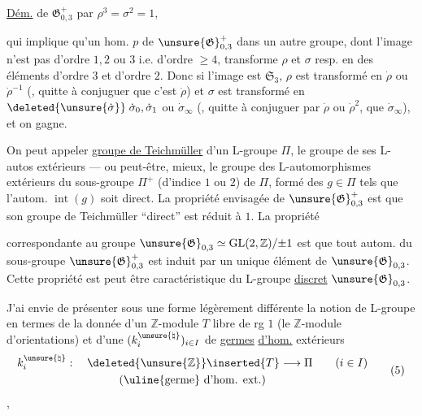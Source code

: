 \uline{Dém.} 
de $\mathfrak{G}_{0,3}^{+}$ par $\rho^3=\sigma^2=1$,

qui implique qu'un hom. $p$ de $\unsure{\mathfrak G}_{0,3}^{+}$ dans un autre groupe, dont l'image n'est pas d'ordre $1,2$ ou $3$ i.e. d'ordre $\geq 4$, transforme $\rho$ et $\sigma$ resp. en des éléments d'ordre $3$ et d'ordre $2$. Donc si l'image est $\mathfrak S_3$, $\rho$ est transformé en $\dot\rho$ ou $\dot\rho^{-1}$ (, quitte à conjuguer  que c'est $\dot\rho$) et $\sigma$ est transformé en $\deleted{\unsure{\dot\sigma}}\;\dot\sigma_0,\dot\sigma_1$ ou $\dot\sigma_\infty$ (, quitte à conjuguer par $\dot\rho$ ou $\dot\rho^2$, que  $\dot\sigma_\infty$), et on gagne.

On peut appeler \uline{groupe de Teichmüller} d'un L-groupe $\Pi$, le groupe de ses L-autos extérieurs --- ou peut-être, mieux, le groupe des L-automorphismes extérieurs du sous-groupe $\Pi^+$ (d'indice $1$ ou $2$) de $\Pi$, formé des $g\in\Pi$ tels que l'autom. $\operatorname{int}(g)$ soit direct. La propriété envisagée de $\unsure{\mathfrak G}_{0,3}^{+}$ est que son groupe de Teichmüller ``direct'' est réduit à $1$. La propriété


correspondante au groupe $\unsure{\mathfrak G}_{0,3}\simeq\operatorname{GL}(2,\mathbb Z)/{\pm1}$ est que tout  autom. du sous-groupe $\unsure{\mathfrak G}_{0,3}^{+}$ est induit par un unique élément de $\unsure{\mathfrak G}_{0,3}$. Cette propriété est peut être caractéristique du L-groupe \uline{discret} $\unsure{\mathfrak G}_{0,3}$.


J'ai envie de présenter sous une forme légèrement différente la notion de L-groupe\inserted{ $\Pi$,} en termes de la donnée d'un $\mathbb Z$-module $T$ libre de rg $1$ (le $\mathbb Z$-module d'orientations) et d'une   $(k_i^{\unsure{\natural}})_{i\in I}$ de \uline{germes} \uline{d'hom.} extérieurs
\[
\begin{gathered}
k_i^{\unsure{\natural}}:\quad \deleted{\unsure{\mathbb Z}}\inserted{T}\longrightarrow\Pi
\qquad (i\in I)\\
(\text{\uline{germe} d'hom. ext.})
\end{gathered}
\tag{5}
\]
,

